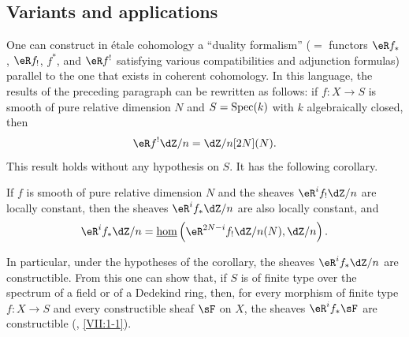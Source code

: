 \subsection{Variants and applications}\label{I:6-4}

One can construct in étale cohomology a “duality formalism”
($=$ functors $\eR f_*$, $\eR f_!$, $f^*$, and $\eR f^!$ satisfying various
compatibilities and adjunction formulas) parallel to the one that exists
in coherent cohomology. In this language, the results of the preceding
paragraph can be rewritten as follows: if $f:X\to S$ is smooth of pure
relative dimension $N$ and $S=\operatorname{Spec}(k)$ with $k$ algebraically closed,
then
\[
  \eR f^! \dZ/n = \dZ/n [2N](N) \text{.}
\]
This result holds without any hypothesis on $S$. It has the following
corollary.

\begin{corollary}\label{I:6-4-1}
If $f$ is smooth of pure relative dimension $N$ and the sheaves
$\eR^if_!\dZ/n$ are locally constant, then the sheaves
$\eR^if_*\dZ/n$ are also locally constant, and
\[
  \eR^i f_* \dZ/n = \const\hom\left(\eR^{2 N-i} f_! \dZ/n(N),\dZ/n\right)\text{.}
\]
\end{corollary}

In particular, under the hypotheses of the corollary, the sheaves
$\eR^if_*\dZ/n$ are constructible. From this one can show that, if $S$
is of finite type over the spectrum of a field or of a Dedekind ring,
then, for every morphism of finite type $f:X\to S$ and every constructible
sheaf $\sF$ on $X$, the sheaves $\eR^if_*\sF$ are constructible
(, \ref{VII:1-1}).
